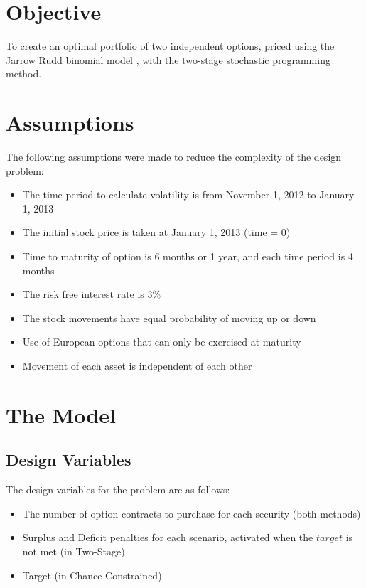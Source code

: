 \documentclass[12pt]{article}
\begin{document}
\section{Objective}
To create an optimal portfolio of two independent options, priced using the Jarrow Rudd binomial model \cite{jarrow1983option, jrudd_other, jrudd_impl}, with the two-stage stochastic programming method.

\section{Assumptions}

The following assumptions were made to reduce the complexity of the design problem:
\begin{itemize}
	\item The time period to calculate volatility is from November 1, 2012 to January 1, 2013
	\item The initial stock price is taken at January 1, 2013 (time = 0)
	\item Time to maturity of option is 6 months or 1 year, and each time period is 4 months
	\item The risk free interest rate is 3\%
	\item The stock movements have equal probability of moving up or down
	\item Use of European options that can only be exercised at maturity
	\item Movement of each asset is independent of each other
\end{itemize}


\section{The Model}
\subsection{Design Variables}
The design variables for the problem are as follows:
\begin{itemize}
	\item The number of option contracts to purchase for each security (both methods)
	\item Surplus and Deficit penalties for each scenario, activated when the $target$ is not met (in Two-Stage)
	\item Target (in Chance Constrained)
\end{itemize}
\end{document}
